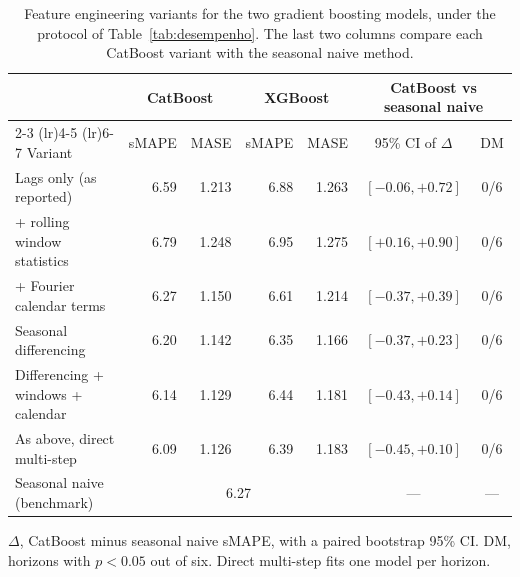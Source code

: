 \begin{table}[htbp]
\centering
\small
\setlength{\tabcolsep}{4pt}
\caption{Feature engineering variants for the two gradient boosting models, under the protocol of Table~\ref{tab:desempenho}. The last two columns compare each CatBoost variant with the seasonal naive method.}
\label{tab:variantes}
\begin{tabular}{lrrrrcc}
\toprule
& \multicolumn{2}{c}{CatBoost} & \multicolumn{2}{c}{XGBoost}
& \multicolumn{2}{c}{CatBoost vs seasonal naive} \\
\cmidrule(lr){2-3} \cmidrule(lr){4-5} \cmidrule(lr){6-7}
Variant & sMAPE & MASE & sMAPE & MASE & 95\% CI of $\Delta$ & DM \\
\midrule
Lags only (as reported) & 6.59 & 1.213 & 6.88 & 1.263 & $[-0.06, +0.72]$ & 0/6 \\
+ rolling window statistics & 6.79 & 1.248 & 6.95 & 1.275 & $[+0.16, +0.90]$ & 0/6 \\
+ Fourier calendar terms & 6.27 & 1.150 & 6.61 & 1.214 & $[-0.37, +0.39]$ & 0/6 \\
Seasonal differencing & 6.20 & 1.142 & 6.35 & 1.166 & $[-0.37, +0.23]$ & 0/6 \\
Differencing + windows + calendar & 6.14 & 1.129 & 6.44 & 1.181 & $[-0.43, +0.14]$ & 0/6 \\
As above, direct multi-step & 6.09 & 1.126 & 6.39 & 1.183 & $[-0.45, +0.10]$ & 0/6 \\
\midrule
Seasonal naive (benchmark) & \multicolumn{4}{c}{6.27 \quad 1.148} & --- & --- \\
\bottomrule
\end{tabular}

\vspace{0.5em}
\begin{minipage}{\textwidth}
\footnotesize
$\Delta$, CatBoost minus seasonal naive sMAPE, with a paired bootstrap 95\% CI. DM, horizons with $p<0.05$ out of six. Direct multi-step fits one model per horizon.
\end{minipage}
\end{table}

